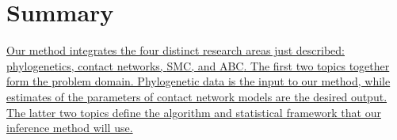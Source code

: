 \section{Summary}

{\color{blue}\uline{ Our method integrates the four distinct research areas
  just described: phylogenetics, contact networks, \acrlong{SMC}, and
  \acrlong{ABC}. The first two topics together form the problem domain.
  Phylogenetic data is the input to our method, while estimates of the
  parameters of contact network models are the desired output. The latter two
  topics define the algorithm and statistical framework that our inference
method will use. }}
